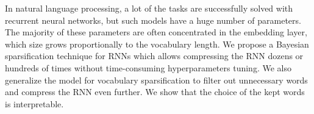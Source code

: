In natural language processing, a lot of the tasks are successfully solved with recurrent neural networks, but such models have a huge number of parameters. The majority of these parameters are often concentrated in the embedding layer, which size grows proportionally to the vocabulary length. We propose a Bayesian sparsification technique for RNNs which allows compressing the RNN dozens or hundreds of times without time-consuming hyperparameters tuning. We also generalize the model for vocabulary sparsification to filter out unnecessary words and compress the RNN even further. We show that the choice of the kept words is interpretable.
